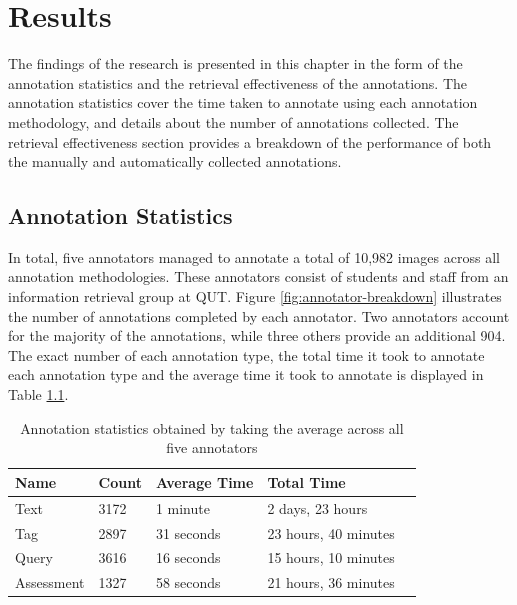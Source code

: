 \chapter{Results}\label{chapter:results}

The findings of the research is presented in this chapter in the form of the annotation statistics and the retrieval effectiveness of the annotations. The annotation statistics cover the time taken to annotate using each annotation methodology, and details about the number of annotations collected. The retrieval effectiveness section provides a breakdown of the performance of both the manually and automatically collected annotations.

\section{Annotation Statistics}

In total, five annotators managed to annotate a total of 10,982 images across all annotation methodologies. These annotators consist of students and staff from an information retrieval group at QUT. Figure \ref{fig:annotator-breakdown} illustrates the number of annotations completed by each annotator. Two annotators account for the majority of the annotations, while three others provide an additional 904. The exact number of each annotation type, the total time it took to annotate each annotation type and the average time it took to annotate is displayed in Table \ref{table:annotation-stats}.

\begin{table}[b]
    \centering
    \begin{tabular}{ | l | l | l | l | p{5cm} |}
    \hline
    Name & Count & Average Time & Total Time \\ \hline
    Text & 3172 & 1 minute & 2 days, 23 hours \\ \hline
    Tag & 2897 & 31 seconds & 23 hours, 40 minutes \\ \hline
    Query & 3616 & 16 seconds & 15 hours, 10 minutes \\ \hline
    Assessment & 1327 & 58 seconds & 21 hours, 36 minutes \\ \hline
    \end{tabular}
    \caption{Annotation statistics obtained by taking the average across all five annotators}
    \label{table:annotation-stats}
\end{table}

